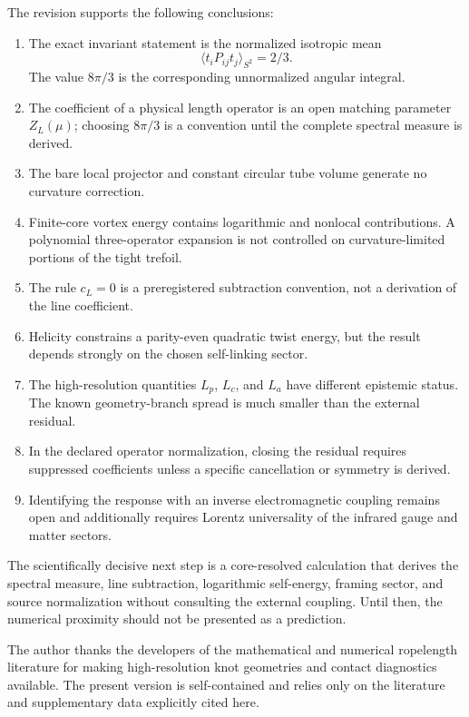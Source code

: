 \documentclass[aps,pre,preprint,notitlepage,nofootinbib,superscriptaddress]{revtex4-2}
\newcommand{\ZL}{Z_L}
\begin{document}
The revision supports the following conclusions:
\begin{enumerate}[leftmargin=*]
  \item The exact invariant statement is the normalized isotropic mean
  \[
    \langle t_iP_{ij}t_j\rangle_{S^2}=2/3.
  \]
  The value $8\pi/3$ is the corresponding unnormalized angular integral.
  \item The coefficient of a physical length operator is an open matching parameter $\ZL(\mu)$; choosing $8\pi/3$ is a convention until the complete spectral measure is derived.
  \item The bare local projector and constant circular tube volume generate no curvature correction.
  \item Finite-core vortex energy contains logarithmic and nonlocal contributions.  A polynomial three-operator expansion is not controlled on curvature-limited portions of the tight trefoil.
  \item The rule $c_L=0$ is a preregistered subtraction convention, not a derivation of the line coefficient.
  \item Helicity constrains a parity-even quadratic twist energy, but the result depends strongly on the chosen self-linking sector.
  \item The high-resolution quantities $L_p$, $L_c$, and $L_a$ have different epistemic status.  The known geometry-branch spread is much smaller than the external residual.
  \item In the declared operator normalization, closing the residual requires suppressed coefficients unless a specific cancellation or symmetry is derived.
  \item Identifying the response with an inverse electromagnetic coupling remains open and additionally requires Lorentz universality of the infrared gauge and matter sectors.
\end{enumerate}

The scientifically decisive next step is a core-resolved calculation that derives the spectral measure, line subtraction, logarithmic self-energy, framing sector, and source normalization without consulting the external coupling.  Until then, the numerical proximity should not be presented as a prediction.

\begin{acknowledgments}
The author thanks the developers of the mathematical and numerical ropelength literature for making high-resolution knot geometries and contact diagnostics available.  The present version is self-contained and relies only on the literature and supplementary data explicitly cited here.
\end{acknowledgments}
\end{document}
